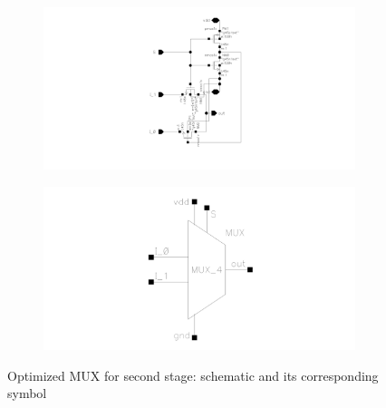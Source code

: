 \documentclass[12pt]{article}
\begin{document}
\begin{figure}[H]
    \centering
    \begin{subfigure}[b]{0.48\textwidth}
        \centering
        \includegraphics[width=\textwidth]{writeup/figures/mux_w1_opt.png}
        \caption{}
        \label{fig:mux_w1_opt}
    \end{subfigure}
    \hfill
    \begin{subfigure}[b]{0.48\textwidth}
        \centering
        \includegraphics[width=\textwidth]{writeup/figures/mux_w1_opt_sym.png}
        \caption{}
        \label{fig:mux_w1_opt_sym}
    \end{subfigure}
    \caption{Optimized MUX for second stage: schematic and its corresponding symbol}
    \label{fig:mux1_opt_comparison}
\end{figure}
\end{document}
